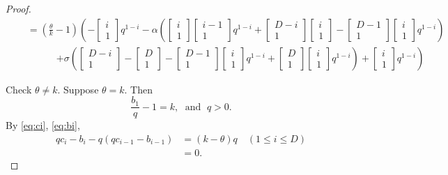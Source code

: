 \documentclass[
]{book}
\theoremstyle{definition}
\theoremstyle{definition}
\theoremstyle{definition}
\theoremstyle{definition}
\theoremstyle{remark}
\begin{document}
\begin{proof}
\begin{align}
& \quad = \left(\frac{\theta}{k}-1\right)\left(-\begin{bmatrix}{i}\\{1}\end{bmatrix}q^{1-i}-\alpha\left(\begin{bmatrix}{i}\\{1}\end{bmatrix}\begin{bmatrix}{i-1}\\{1}\end{bmatrix}q^{1-i}+\begin{bmatrix}{D-i}\\{1}\end{bmatrix}\begin{bmatrix}{i}\\{1}\end{bmatrix}-\begin{bmatrix}{D-1}\\{1}\end{bmatrix}\begin{bmatrix}{i}\\{1}\end{bmatrix}q^{1-i}\right)\right.\\
&  \qquad\qquad \left.+\sigma\left(\begin{bmatrix}{D-i}\\{1}\end{bmatrix}-\begin{bmatrix}{D}\\{1}\end{bmatrix}-\begin{bmatrix}{D-1}\\{1}\end{bmatrix}\begin{bmatrix}{i}\\{1}\end{bmatrix}q^{1-i}+\begin{bmatrix}{D}\\{1}\end{bmatrix}\begin{bmatrix}{i}\\{1}\end{bmatrix}q^{1-i}\right)+\begin{bmatrix}{i}\\{1}\end{bmatrix}q^{1-i}\right)
\end{align}

Check \(\theta\neq k\). Suppose \(\theta = k\). Then
\[\frac{b_1}{q}-1 = k, \; \text{ and }\; q>0.\]
By \eqref{eq:ci}, \eqref{eq:bi},
\begin{align}
qc_i - b_i - q(qc_{i-1}-b_{i-1}) & = (k-\theta)q \quad (1\leq i\leq D)\\
& = 0.
\end{align}


\end{proof}
\end{document}
